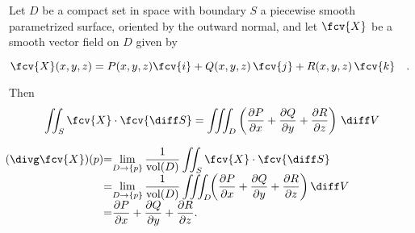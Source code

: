

\begin{frame}

\begin{theorem}
Let $D$ be a compact set in space with boundary $S$ a piecewise smooth parametrized surface, oriented by the outward normal, and let $\fcv{X}$ be a smooth vector field on $D$ given by

\hfil $
\fcv{X}(x,y,z)= P (x,y,z) \fcv{i} + Q(x,y,z) \, \fcv{j} + R(x,y,z)\, \fcv{k}\quad .
$

Then
\[
\iint_S \fcv{X} \cdot \fcv{\diff S} = \iiint_D \left(\frac{\partial P}{\partial x}+ \frac{\partial Q}{\partial y} + \frac{\partial R}{\partial z} \right) \, \diff V
\]
\end{theorem}
\begin{corollary}
$
\begin{array}{@{\!\!}r@{}c@{}l}
  (\divg \fcv{X}) (p) &= &\displaystyle
\lim\limits_{D\to \{p\}} \frac{1}{\text{vol}(D)}\iint_S \fcv{X} \cdot \fcv{\diff S}   \\
&= &\displaystyle \lim\limits_{D\to \{p\}} \frac{1}{\text{vol}(D)}\iiint_D \!\! \left(\frac{\partial P}{\partial x}+ \frac{\partial Q}{\partial y} + \frac{\partial R}{\partial z} \right)  \diff V \\
&=&\displaystyle
  \frac{\partial P}{\partial x}+ \frac{\partial Q}{\partial y} + \frac{\partial R}{\partial z}.
\end{array}
$
\end{corollary}
\end{frame}

